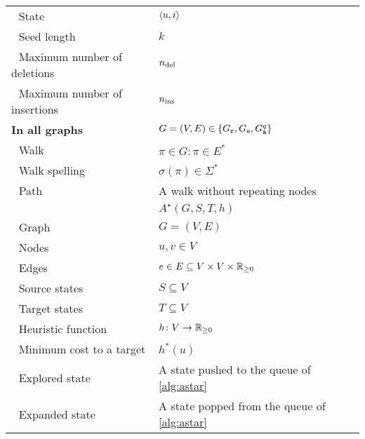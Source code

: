 \begin{table}[!h]
\begin{tabular}{ll}
	\,\, State& $\langle u, i \rangle$\\
	\,\, Seed length& $k$\\
	\,\, Maximum number of deletions& $n_\text{del}$\\
	\,\, Maximum number of insertions& $n_\text{ins}$\\
	\hline
	\textbf{In all graphs}& $G = (V,E) \in \{ G_\texttt{r}, G_\texttt{e}, G_\texttt{a}^{q} \}$ \\
	\,\, Walk& $\pi \in G: \pi \in E^*$\\
	\,\, Walk spelling& $\sigma(\pi) \in \Sigma^*$\\
	\,\, Path& A walk without repeating nodes\\
	\hline
	\textbf{\A} & $A^\star(G,S,T,h)$\\
	\,\, Graph& $G=(V,E)$\\
	\,\, Nodes& $u,v \in V$\\
	\,\, Edges& $e \in E \subseteq V \times V \times \mathbb{R}_{\geq 0}$\\ 
	\,\, Source states& $S \subseteq V$\\
	\,\, Target states& $T \subseteq V$\\
	\,\, Heuristic function& $h \colon V \to \mathbb{R}_{\geq 0}$\\
	\,\, Minimum cost to a target& $h^*(u)$\\
	\,\, Explored state & A state pushed to the queue of \cref{alg:astar}\\
	\,\, Expanded state & A state popped from the queue of \cref{alg:astar}\\
	\hline
\end{tabular}
\end{table}
